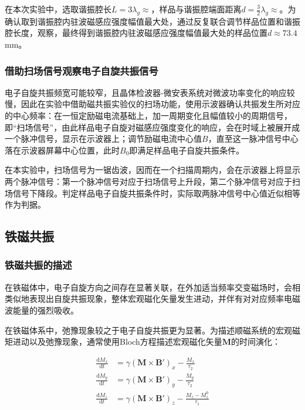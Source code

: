 \documentclass{thuemp}
\begin{document}
    在本次实验中，选取谐振腔长$L=3\lambda_g\approx$，样品与谐振腔端面距离$d=\frac{3}{2}\lambda_g\approx$。为确认取到谐振腔内驻波磁感应强度幅值最大处，通过反复联合调节样品位置和谐振腔长度，观察，最终得到谐振腔内驻波磁感应强度幅值最大处的样品位置$d \approx 73.4 $\si{\milli\meter}。
    
    \subsubsection{借助扫场信号观察电子自旋共振信号}
    
    电子自旋共振频宽可能较窄，且晶体检波器-微安表系统对微波功率变化的响应较慢，因此在实验中借助磁共振实验仪的扫场功能，使用示波器确认共振发生所对应的中心频率：在一恒定励磁电流基础上，加一周期变化且幅值较小的周期信号，即“扫场信号”，由此样品电子自旋对磁感应强度变化的响应，会在时域上被展开成一个脉冲信号，显示在示波器上；调节励磁电流中心值$B$，直至这一脉冲信号中心落在示波器屏幕中心位置，此时$B_0$即满足样品电子自旋共振条件。
    
    在本实验中，扫场信号为一锯齿波，因而在一个扫描周期内，会在示波器上将显示两个脉冲信号：第一个脉冲信号对应于扫场信号上升段，第二个脉冲信号对应于扫场信号下降段。判定样品电子自旋共振条件时，实际取两脉冲信号中心值近似相等作为判据。
    
    \subsection{铁磁共振}
    
    \subsubsection{铁磁共振的描述}
    
    在铁磁体中，电子自旋方向之间存在显著关联，在外加适当频率交变磁场时，会相类似地表现出自旋共振现象，整体宏观磁化矢量发生进动，并伴有对对应频率电磁波能量的强烈吸收。
    
    在铁磁体系中，弛豫现象较之于电子自旋共振更为显著。为描述顺磁系统的宏观磁矩进动以及弛豫现象，通常使用Bloch方程描述宏观磁化矢量$\symbf{M}$的时间演化：
    
    \begin{equation}
    \begin{aligned}
        \frac{\mathrm{d} M_x}{\mathrm{d} t} &= \gamma (\symbf{M} \times \symbf{B'})_x - \frac{M_x}{\tau_2} \\
        \frac{\mathrm{d} M_y}{\mathrm{d} t} &= \gamma (\symbf{M} \times \symbf{B'})_y - \frac{M_y}{\tau_2} \\
        \frac{\mathrm{d} M_z}{\mathrm{d} t} &= \gamma (\symbf{M} \times \symbf{B'})_z - \frac{M_z - M_z^0}{\tau_1}
    \end{aligned}
    \end{equation}
    
\end{document}
